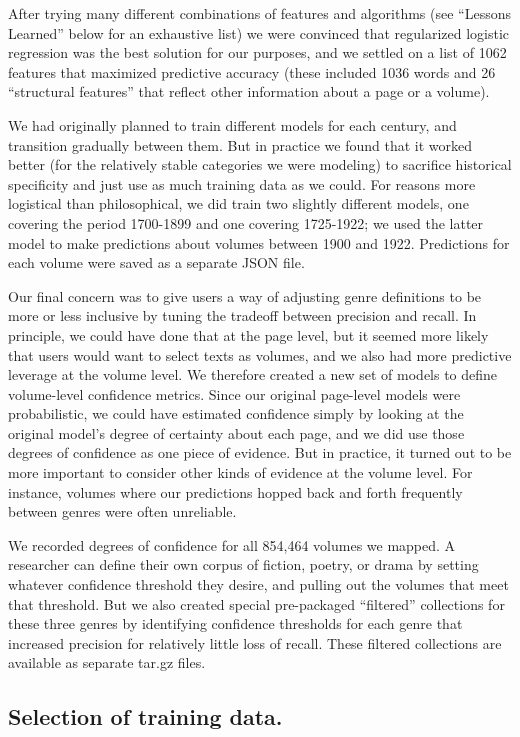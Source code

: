 \documentclass[paper=a4, fontsize=12pt]{scrartcl}
\numberwithin{equation}{section}		%
\numberwithin{figure}{section}			%
\numberwithin{table}{section}				%
\begin{document}
After trying many different combinations of features and algorithms (see ``Lessons Learned'' below for an exhaustive list) we were convinced that regularized logistic regression was the best solution for our purposes, and we settled on a list of 1062 features that maximized predictive accuracy (these included 1036 words and 26 ``structural features'' that reflect other information about a page or a volume).

We had originally planned to train different models for each century, and transition gradually between them. But in practice we found that it worked better (for the relatively stable categories we were modeling) to sacrifice historical specificity and just use as much training data as we could. For reasons more logistical than philosophical, we did train two slightly different models, one covering the period 1700-1899 and one covering 1725-1922; we used the latter model to make predictions about volumes between 1900 and 1922. Predictions for each volume were saved as a separate JSON file.

Our final concern was to give users a way of adjusting genre definitions to be more or less inclusive by tuning the tradeoff between precision and recall. In principle, we could have done that at the page level, but it seemed more likely that users would want to select texts as volumes, and we also had more predictive leverage at the volume level. We therefore created a new set of models to define volume-level confidence metrics. Since our original page-level models were probabilistic, we could have estimated confidence simply by looking at the original model's degree of certainty about each page, and we did use those degrees of confidence as one piece of evidence. But in practice, it turned out to be more important to consider other kinds of evidence at the volume level. For instance, volumes where our predictions hopped back and forth frequently between genres were often unreliable.

We recorded degrees of confidence for all 854,464 volumes we mapped. A researcher can define their own corpus of fiction, poetry, or drama by setting whatever confidence threshold they desire, and pulling out the volumes that meet that threshold. But we also created special pre-packaged ``filtered'' collections for these three genres by identifying confidence thresholds for each genre that increased precision for relatively little loss of recall. These filtered collections are available as separate tar.gz files.

\subsection{Selection of training data.}
\end{document}
